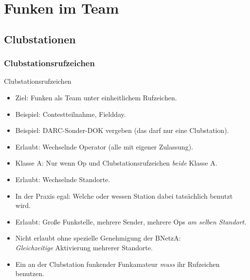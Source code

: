 \section{Funken im Team}

\subsection{Clubstationen}

\begin{frame}
  \frametitle{Clubstationsrufzeichen}

  \begin{center}
    \Large Clubstationsrufzeichen
  \end{center}

  \begin{itemize}[<+->]
    \item Ziel: Funken als Team unter einheitlichem Rufzeichen.
    \item Beispiel: Contestteilnahme, Fieldday.
    \item Beispiel: DARC-Sonder-DOK vergeben (das darf nur eine Clubstation).
    \item Erlaubt: Wechselnde Operator (alle mit eigener Zulassung).
    \item Klasse A: Nur wenn Op und Clubstationsrufzeichen \emph{beide} Klasse A.
    \item Erlaubt: Wechselnde Standorte.
    \item In der Praxis egal: Welche oder wessen Station dabei tatsächlich benutzt wird.
    \item Erlaubt: Große Funkstelle, mehrere Sender, mehrere Ops \emph{am selben Standort.}
    \item Nicht erlaubt ohne spezielle Genehmigung der BNetzA:\\
          \emph{Gleichzeitige} Aktivierung mehrerer Standorte.
    \item Ein an der Clubstation funkender Funkamateur \emph{muss} ihr Rufzeichen benutzen.
  \end{itemize}

\end{frame}


